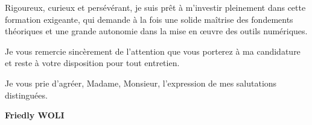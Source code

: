 \documentclass[11pt,a4paper]{article}
\begin{document}
	Rigoureux, curieux et persévérant, je suis prêt à m’investir pleinement dans cette formation exigeante, qui demande à la fois une solide maîtrise des fondements théoriques et une grande autonomie dans la mise en œuvre des outils numériques. 
	
	Je vous remercie sincèrement de l’attention que vous porterez à ma candidature et reste à votre disposition pour tout entretien.
	
	Je vous prie d’agréer, Madame, Monsieur, l’expression de mes salutations distinguées.
	
	\vspace{0.8cm}
	
	\begin{flushright}
		\textbf{Friedly WOLI}
	\end{flushright}
	
\end{document}
